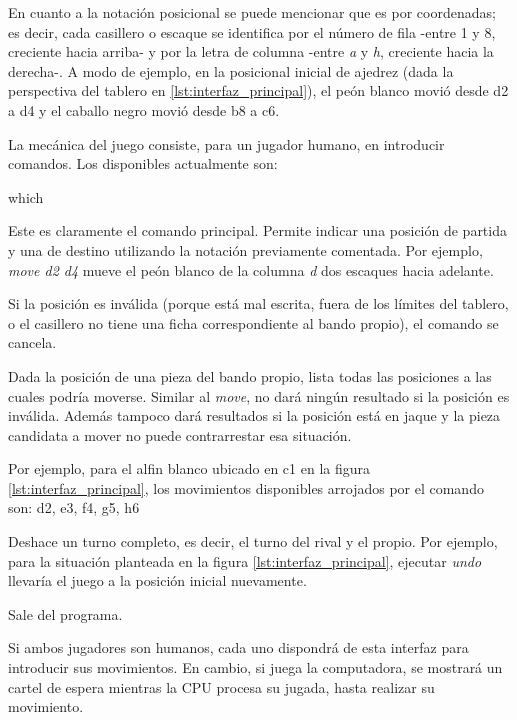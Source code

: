 \documentclass{llncs}
\begin{document}
En cuanto a la notación posicional se puede mencionar que es por coordenadas; es decir, cada casillero o escaque se identifica por el número de fila -entre 1 y 8, creciente hacia arriba- y por la letra de columna -entre \textit{a}  y \textit{h}, creciente hacia la derecha-. A modo de ejemplo, en la posicional inicial de ajedrez (dada la perspectiva del tablero en \ref{lst:interfaz_principal}), el peón blanco movió desde d2 a d4 y el caballo negro movió desde b8 a c6.

La mecánica del juego consiste, para un jugador humano, en introducir comandos. Los disponibles actualmente son:
\newline

\begin{labeling}{which}
  \item [move] Este es claramente el comando principal. Permite indicar una posición de partida y una de destino utilizando la notación previamente comentada. Por ejemplo, \textit{move d2 d4} mueve el peón blanco de la columna \textit{d}  dos escaques hacia adelante.

    Si la posición es inválida (porque está mal escrita, fuera de los límites del tablero, o el casillero no tiene una ficha correspondiente al bando propio), el comando se cancela.
  \item[which] Dada la posición de una pieza del bando propio, lista todas las posiciones a las cuales podría moverse. Similar al \textit{move}, no dará ningún resultado si la posición es inválida. Además tampoco dará resultados si la posición está en jaque y la pieza candidata a mover no puede contrarrestar esa situación.

    Por ejemplo, para el alfin blanco ubicado en c1 en la figura \ref{lst:interfaz_principal}, los movimientos disponibles arrojados por el comando son: d2, e3, f4, g5, h6
  \item[undo] Deshace un turno completo, es decir, el turno del rival y el propio. Por ejemplo, para la situación planteada en la figura \ref{lst:interfaz_principal}, ejecutar \textit{undo} llevaría el juego a la posición inicial nuevamente.
  \item[exit] Sale del programa.
\end{labeling}

Si ambos jugadores son humanos, cada uno dispondrá de esta interfaz para introducir sus movimientos. En cambio, si juega la computadora, se mostrará un cartel de espera mientras la CPU procesa su jugada, hasta realizar su movimiento.
\end{document}
